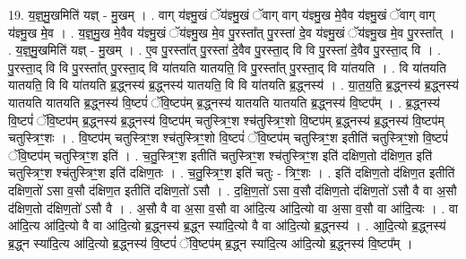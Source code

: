 \documentclass[17pt]{extarticle}
\begin{document}
19. य॒ज्ञ्॒मु॒खमिति॑ यज्ञ् - मु॒खम् । . वाग् य॑ज्ञ्मु॒खं ॅय॑ज्ञ्मु॒खं ॅवाग् वाग् य॑ज्ञ्मु॒ख मे॒वैव य॑ज्ञ्मु॒खं ॅवाग् वाग् य॑ज्ञ्मु॒ख मे॒व । . य॒ज्ञ्॒मु॒ख मे॒वैव य॑ज्ञ्मु॒खं ॅय॑ज्ञ्मु॒ख मे॒व पु॒रस्ता᳚त् पु॒रस्ता॑ दे॒व य॑ज्ञ्मु॒खं ॅय॑ज्ञ्मु॒ख मे॒व पु॒रस्ता᳚त् । . य॒ज्ञ्॒मु॒खमिति॑ यज्ञ् - मु॒खम् । . ए॒व पु॒रस्ता᳚त् पु॒रस्ता॑ दे॒वैव पु॒रस्ता॒द् वि वि पु॒रस्ता॑ दे॒वैव पु॒रस्ता॒द् वि । . पु॒रस्ता॒द् वि वि पु॒रस्ता᳚त् पु॒रस्ता॒द् वि या॑तयति यातयति॒ वि पु॒रस्ता᳚त् पु॒रस्ता॒द् वि या॑तयति । . वि या॑तयति यातयति॒ वि वि या॑तयति ब्र॒द्ध्नस्य॑ ब्र॒द्ध्नस्य॑ यातयति॒ वि वि या॑तयति ब्र॒द्ध्नस्य॑ । . या॒त॒य॒ति॒ ब्र॒द्ध्नस्य॑ ब्र॒द्ध्नस्य॑ यातयति यातयति ब्र॒द्ध्नस्य॑ वि॒ष्टपं॑ ॅवि॒ष्टप॑म् ब्र॒द्ध्नस्य॑ यातयति यातयति ब्र॒द्ध्नस्य॑ वि॒ष्टप᳚म् । . ब्र॒द्ध्नस्य॑ वि॒ष्टपं॑ ॅवि॒ष्टप॑म् ब्र॒द्ध्नस्य॑ ब्र॒द्ध्नस्य॑ वि॒ष्टप॑म् चतुस्त्रिꣳ॒॒श श्च॑तुस्त्रिꣳ॒॒शो वि॒ष्टप॑म् ब्र॒द्ध्नस्य॑ ब्र॒द्ध्नस्य॑ वि॒ष्टप॑म् चतुस्त्रिꣳ॒॒शः । . वि॒ष्टप॑म् चतुस्त्रिꣳ॒॒श श्च॑तुस्त्रिꣳ॒॒शो वि॒ष्टपं॑ ॅवि॒ष्टप॑म् चतुस्त्रिꣳ॒॒श इतीति॑ चतुस्त्रिꣳ॒॒शो वि॒ष्टपं॑ ॅवि॒ष्टप॑म् चतुस्त्रिꣳ॒॒श इति॑ । . च॒तु॒स्त्रिꣳ॒॒श इतीति॑ चतुस्त्रिꣳ॒॒श श्च॑तुस्त्रिꣳ॒॒श इति॑ दक्षिण॒तो द॑क्षिण॒त इति॑ चतुस्त्रिꣳ॒॒श श्च॑तुस्त्रिꣳ॒॒श इति॑ दक्षिण॒तः । . च॒तु॒स्त्रिꣳ॒॒श इति॑ चतुः - त्रिꣳ॒॒शः । . इति॑ दक्षिण॒तो द॑क्षिण॒त इतीति॑ दक्षिण॒तो॑ ऽसा व॒सौ द॑क्षिण॒त इतीति॑ दक्षिण॒तो॑ ऽसौ । . द॒क्षि॒ण॒तो॑ ऽसा व॒सौ द॑क्षिण॒तो द॑क्षिण॒तो॑ ऽसौ वै वा अ॒सौ द॑क्षिण॒तो द॑क्षिण॒तो॑ ऽसौ वै । . अ॒सौ वै वा अ॒सा व॒सौ वा आ॑दि॒त्य आ॑दि॒त्यो वा अ॒सा व॒सौ वा आ॑दि॒त्यः । . वा आ॑दि॒त्य आ॑दि॒त्यो वै वा आ॑दि॒त्यो ब्र॒द्ध्नस्य॑ ब्र॒द्ध्न स्या॑दि॒त्यो वै वा आ॑दि॒त्यो ब्र॒द्ध्नस्य॑ । . आ॒दि॒त्यो ब्र॒द्ध्नस्य॑ ब्र॒द्ध्न स्या॑दि॒त्य आ॑दि॒त्यो ब्र॒द्ध्नस्य॑ वि॒ष्टपं॑ ॅवि॒ष्टप॑म् ब्र॒द्ध्न स्या॑दि॒त्य आ॑दि॒त्यो ब्र॒द्ध्नस्य॑ वि॒ष्टप᳚म् । \newline
\end{document}
